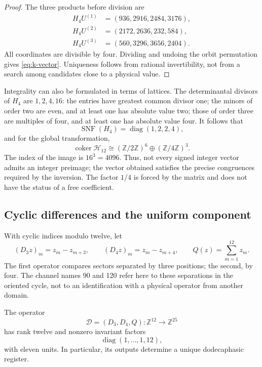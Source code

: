 \begin{proof}
The three products before division are
\begin{align*}
 H_4U^{(1)}&=(936,2916,2484,3176),\\
 H_4U^{(2)}&=(2172,2636,232,584),\\
 H_4U^{(3)}&=(560,3296,3656,2404).
\end{align*}
All coordinates are divisible by four. Dividing and undoing the
orbit permutation gives \eqref{eq:k-vector}. Uniqueness follows from
rational invertibility, not from a search among candidates close to
a physical value.
\end{proof}

Integrality can also be formulated in terms of lattices. The
determinantal divisors of \(H_4\) are \(1,2,4,16\): the entries
have greatest common divisor one; the minors of order two are even, and
at least one has absolute value two; those of order three are multiples of four, and
at least one has absolute value four. It follows that
\[
 \operatorname{SNF}(H_4)=\operatorname{diag}(1,2,2,4),
\]
and for the global transformation,
\[
 \operatorname{coker}\mathcal H_{12}
 \cong(\mathbb Z/2\mathbb Z)^6\oplus(\mathbb Z/4\mathbb Z)^3.
\]
The index of the image is \(16^3=4096\). Thus, not every signed
integer vector admits an integer preimage; the vector obtained satisfies the
precise congruences required by the inversion. The factor \(1/4\) is
forced by the matrix and does not have the status of a free coefficient.

\subsection{Cyclic differences and the uniform component}
\label{subsec:k-transversal}

With cyclic indices modulo twelve, let
\[
 (D_3z)_m=z_m-z_{m+3},\qquad(D_4z)_m=z_m-z_{m+4},
 \qquad Q(z)=\sum_{m=1}^{12}z_m.
\]
The first operator compares sectors separated by three positions; the
second, by four. The channel names 90 and 120 refer here to
these separations in the oriented cycle, not to an identification with a
physical operator from another domain.

\begin{proposition}
\label{prop:k-transversal}
The operator
\[
 \mathcal D=(D_3,D_4,Q):\mathbb Z^{12}\longrightarrow\mathbb Z^{25}
\]
has rank twelve and nonzero invariant factors
\[
 \operatorname{diag}(1,\ldots,1,12),
\]
with eleven units. In particular, its outputs determine a unique dodecaphasic register.
\end{proposition}

